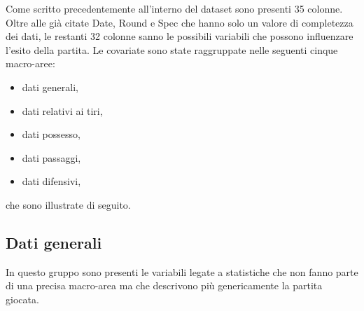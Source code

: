 Come scritto precedentemente all'interno del dataset sono presenti 35 colonne. Oltre alle già citate \textsf{Date}, \textsf{Round} e \textsf{Spec} che hanno solo un valore di completezza dei dati, le restanti 32 colonne sanno le possibili variabili che possono influenzare l'esito della partita.
Le covariate sono state raggruppate nelle seguenti cinque macro-aree:
\begin{itemize}
	\item dati generali,
	\item dati relativi ai tiri,
	\item dati possesso,
	\item dati passaggi,
	\item dati difensivi,
\end{itemize}

che sono illustrate di seguito.

\subsection{Dati generali}
In questo gruppo sono presenti le variabili legate a statistiche che non fanno parte di una precisa macro-area ma che descrivono più genericamente la partita giocata. 

